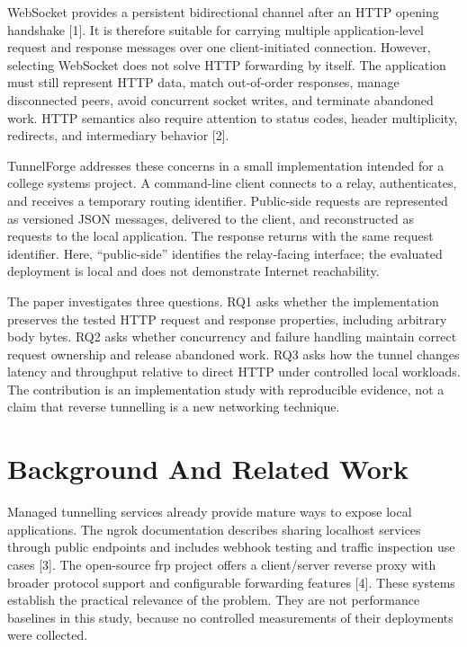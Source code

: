 \documentclass[conference]{IEEEtran}
\begin{document}
WebSocket provides a persistent bidirectional channel after an HTTP opening handshake [1]. It is therefore suitable for carrying multiple application-level request and response messages over one client-initiated connection. However, selecting WebSocket does not solve HTTP forwarding by itself. The application must still represent HTTP data, match out-of-order responses, manage disconnected peers, avoid concurrent socket writes, and terminate abandoned work. HTTP semantics also require attention to status codes, header multiplicity, redirects, and intermediary behavior [2].

TunnelForge addresses these concerns in a small implementation intended for a college systems project. A command-line client connects to a relay, authenticates, and receives a temporary routing identifier. Public-side requests are represented as versioned JSON messages, delivered to the client, and reconstructed as requests to the local application. The response returns with the same request identifier. Here, ``public-side'' identifies the relay-facing interface; the evaluated deployment is local and does not demonstrate Internet reachability.

The paper investigates three questions. RQ1 asks whether the implementation preserves the tested HTTP request and response properties, including arbitrary body bytes. RQ2 asks whether concurrency and failure handling maintain correct request ownership and release abandoned work. RQ3 asks how the tunnel changes latency and throughput relative to direct HTTP under controlled local workloads. The contribution is an implementation study with reproducible evidence, not a claim that reverse tunnelling is a new networking technique.

\section{Background And Related Work}

Managed tunnelling services already provide mature ways to expose local applications. The ngrok documentation describes sharing localhost services through public endpoints and includes webhook testing and traffic inspection use cases [3]. The open-source frp project offers a client/server reverse proxy with broader protocol support and configurable forwarding features [4]. These systems establish the practical relevance of the problem. They are not performance baselines in this study, because no controlled measurements of their deployments were collected.
\end{document}
